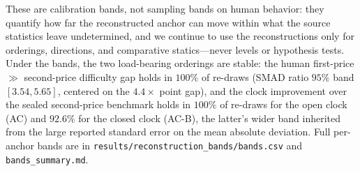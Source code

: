 These are calibration bands, not sampling bands on human behavior: they quantify
how far the reconstructed anchor can move within what the source statistics leave
undetermined, and we continue to use the reconstructions only for orderings,
directions, and comparative statics---never levels or hypothesis tests. Under the
bands, the two load-bearing orderings are stable: the human first-price
$\gg$ second-price difficulty gap holds in $100\%$ of re-draws (SMAD ratio
$95\%$ band $[3.54, 5.65]$, centered on the $4.4\times$ point gap), and the
clock improvement over the sealed second-price benchmark holds in $100\%$ of
re-draws for the open clock (AC) and $92.6\%$ for the closed clock (AC-B), the
latter's wider band inherited from the large reported standard error on the
\citet{breitmoser2022obviousness} mean absolute deviation. Full per-anchor bands
are in \texttt{results/reconstruction\_bands/bands.csv} and
\texttt{bands\_summary.md}.
